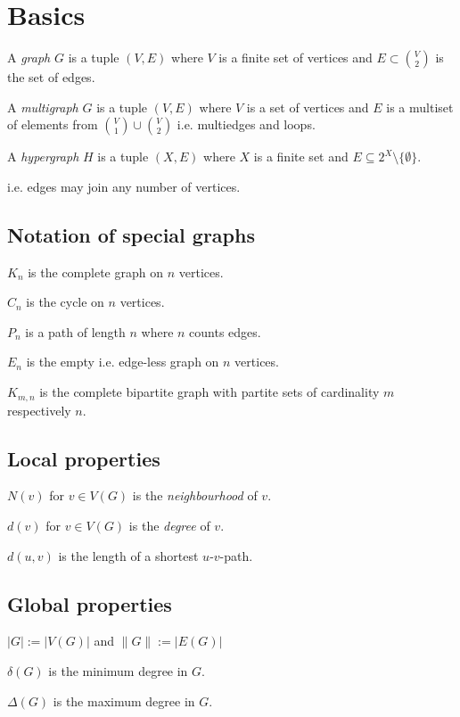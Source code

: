 \section*{Basics}

A \emph{graph} $G$ is a tuple $(V,E)$ where $V$ is a finite set of vertices and $E \subset {V \choose 2}$ is the set of edges.

\spacing

A \emph{multigraph} $G$ is a tuple $(V,E)$ where $V$ is a set of vertices and $E$ is a multiset of elements from ${V \choose 1} \cup {V \choose 2}$ i.e. multiedges and loops.

\spacing

A \emph{hypergraph} $H$ is a tuple $(X,E)$ where $X$ is a finite set and $E \subseteq 2^X \setminus \{\emptyset\}$.

i.e. edges may join any number of vertices.

\subsection*{Notation of special graphs}

$K_n$ is the complete graph on $n$ vertices.

$C_n$ is the cycle on $n$ vertices.

$P_n$ is a path of length $n$ where $n$ counts edges.

$E_n$ is the empty i.e. edge-less graph on $n$ vertices.

$K_{m,n}$ is the complete bipartite graph with partite sets of cardinality $m$ respectively $n$.

\subsection*{Local properties}

$N(v)$ for $v \in V(G)$ is the \emph{neighbourhood} of $v$.

$d(v)$ for $v \in V(G)$ is the \emph{degree} of $v$.

$d(u,v)$ is the length of a shortest $u$-$v$-path.

\subsection*{Global properties}

$|G| := |V(G)|$ and $\|G\| := |E(G)|$

$\delta(G)$ is the minimum degree in $G$.

$\Delta(G)$ is the maximum degree in $G$.

